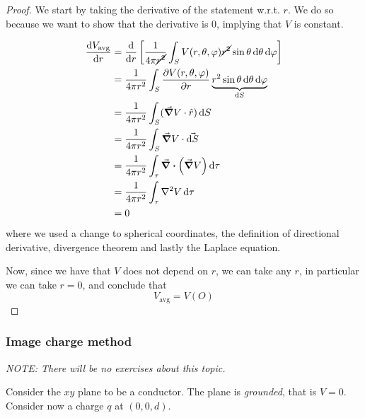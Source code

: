 \documentclass[12pt]{extarticle}
\begin{document}
\begin{proof}
    We start by taking the derivative of the statement w.r.t. $r$.
    We do so because we want to show that the derivative is $0$, implying that $V$ is constant.

    \begin{align}
        \dv{V_\text{avg}}{r} & = \dv{}{r} \left[ \oneover{4 \pi \cancel{r^2}} \int_S V(r, \theta, \varphi) \cancel{r^2} \sin \theta \dd{\theta} \dd{\varphi} \right] \\
                             & = \oneover{4 \pi r^2} \int_S \pdv{V(r, \theta, \varphi)}{r} \underbrace{r^2 \sin \theta \dd{\theta} \dd{\varphi}}_{\dd{S}}            \\
                             & = \oneover{4 \pi r^2} \int_S (\grad V \cdot \hat r) \dd{S}                                                                            \\
                             & = \oneover{4 \pi r^2} \int_S \grad V \cdot \vec{\dd{S}}                                                                               \\
                             & = \oneover{4 \pi r^2} \int_\tau \div (\grad V) \dd{\tau}                                                                              \\
                             & = \oneover{4 \pi r^2} \int_\tau \laplacian V \dd{\tau}                                                                                \\
                             & = 0
    \end{align}
    where we used a change to spherical coordinates, the definition of directional derivative, divergence theorem and lastly the Laplace equation.

    Now, since we have that $V$ does not depend on $r$, we can take any $r$, in particular we can take $r = 0$, and conclude that
    \begin{equation}
        V_\text{avg} = V(O)
    \end{equation}
\end{proof}

\subsubsection{Image charge method}

\emph{NOTE: There will be no exercises about this topic.}

Consider the $xy$ plane to be a conductor.
The plane is \emph{grounded}, that is $V = 0$.
Consider now a charge $q$ at $(0, 0, d)$.
\end{document}

